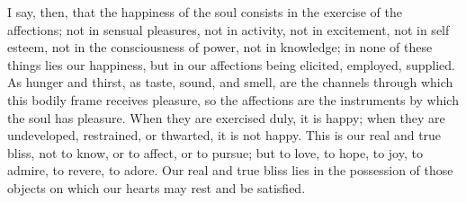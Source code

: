 I say, then, that the happiness of the soul consists in the
exercise of the affections; not in sensual pleasures, not in activity,
not in excitement, not in self esteem, not in the consciousness of
power, not in knowledge; in none of these things lies our happiness,
but in our affections being elicited, employed, supplied. As hunger
and thirst, as taste, sound, and smell, are the channels through which
this bodily frame receives pleasure, so the affections are the
instruments by which the soul has pleasure. When they are exercised
duly, it is happy; when they are undeveloped, restrained, or thwarted,
it is not happy. This is our real and true bliss, not to know, or to
affect, or to pursue; but to love, to hope, to joy, to admire, to
revere, to adore. Our real and true bliss lies in the possession of
those objects on which our hearts may rest and be satisfied.

